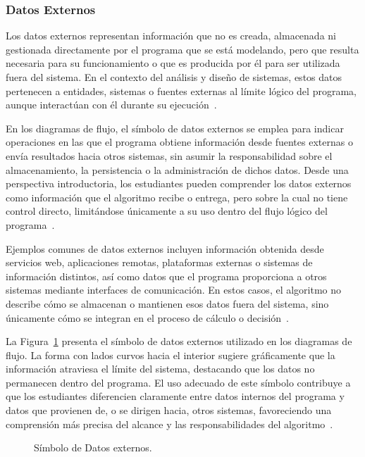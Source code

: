 \documentclass[12pt,twoside]{book}
\begin{document}
					\subsubsection{Datos Externos}
					\noindent
						Los datos externos representan información que no es creada, almacenada ni gestionada directamente por el programa que se está modelando, pero que resulta necesaria para su funcionamiento o que es producida por él para ser utilizada fuera del sistema. En el contexto del análisis y diseño de sistemas, estos datos pertenecen a entidades, sistemas o fuentes externas al límite lógico del programa, aunque interactúan con él durante su ejecución~\cite{Tegarden2025Systems}.
						
						En los diagramas de flujo, el símbolo de datos externos se emplea para indicar operaciones en las que el programa obtiene información desde fuentes externas o envía resultados hacia otros sistemas, sin asumir la responsabilidad sobre el almacenamiento, la persistencia o la administración de dichos datos. Desde una perspectiva introductoria, los estudiantes pueden comprender los datos externos como información que el algoritmo recibe o entrega, pero sobre la cual no tiene control directo, limitándose únicamente a su uso dentro del flujo lógico del programa~\cite{Kelly2015Programming}.
						
						Ejemplos comunes de datos externos incluyen información obtenida desde servicios web, aplicaciones remotas, plataformas externas o sistemas de información distintos, así como datos que el programa proporciona a otros sistemas mediante interfaces de comunicación. En estos casos, el algoritmo no describe cómo se almacenan o mantienen esos datos fuera del sistema, sino únicamente cómo se integran en el proceso de cálculo o decisión~\cite{Tegarden2025Systems,SmartDrawFlowchartSymbols}.
						
						La Figura~\ref{fig:DFDatosExternos} presenta el símbolo de datos externos utilizado en los diagramas de flujo. La forma con lados curvos hacia el interior sugiere gráficamente que la información atraviesa el límite del sistema, destacando que los datos no permanecen dentro del programa. El uso adecuado de este símbolo contribuye a que los estudiantes diferencien claramente entre datos internos del programa y datos que provienen de, o se dirigen hacia, otros sistemas, favoreciendo una comprensión más precisa del alcance y las responsabilidades del algoritmo~\cite{SmartDrawFlowchartSymbols}.
						
						\begin{figure}[h]
							\centering
							\caption{Símbolo de Datos externos.}
							\label{fig:DFDatosExternos}
						\end{figure}
						
\end{document}
